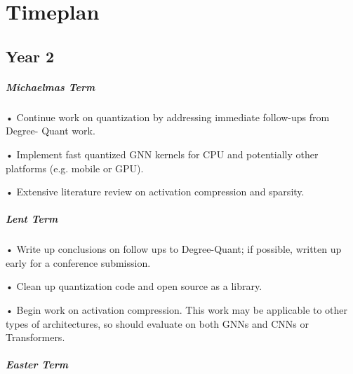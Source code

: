 \documentclass[withindex,glossary]{cam-thesis}
\begin{document}






\chapter{Timeplan} \label{Timeplan}

\section{Year 2}
\paragraph{Michaelmas Term} 

• Continue work on quantization by addressing immediate follow-ups from Degree- Quant work.

• Implement fast quantized GNN kernels for CPU and potentially other platforms (e.g. mobile or GPU).

• Extensive literature review on activation compression and sparsity. 
\paragraph{Lent Term} 

• Write up conclusions on follow ups to Degree-Quant; if possible, written up early for a conference submission.

• Clean up quantization code and open source as a library.

• Begin work on activation compression. This work may be applicable to other types of architectures, so should evaluate on both GNNs and CNNs or Transformers.
\paragraph{Easter Term}
\end{document}

